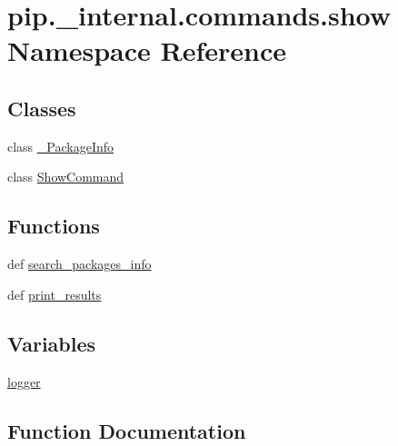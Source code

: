 \hypertarget{namespacepip_1_1__internal_1_1commands_1_1show}{}\section{pip.\+\_\+internal.\+commands.\+show Namespace Reference}
\label{namespacepip_1_1__internal_1_1commands_1_1show}
\subsection*{Classes}
\begin{DoxyCompactItemize}
\item 
class \hyperlink{classpip_1_1__internal_1_1commands_1_1show_1_1__PackageInfo}{\+\_\+\+Package\+Info}
\item 
class \hyperlink{classpip_1_1__internal_1_1commands_1_1show_1_1ShowCommand}{Show\+Command}
\end{DoxyCompactItemize}
\subsection*{Functions}
\begin{DoxyCompactItemize}
\item 
def \hyperlink{namespacepip_1_1__internal_1_1commands_1_1show_a139fe722401a6599c68049f2813deb1d}{search\+\_\+packages\+\_\+info}
\item 
def \hyperlink{namespacepip_1_1__internal_1_1commands_1_1show_a14c3b6992545a8c4b568facb76eaae04}{print\+\_\+results}
\end{DoxyCompactItemize}
\subsection*{Variables}
\begin{DoxyCompactItemize}
\item 
\hyperlink{namespacepip_1_1__internal_1_1commands_1_1show_a8dcbd0248e66771bc7d6533c834232f6}{logger}
\end{DoxyCompactItemize}


\subsection{Function Documentation}
\mbox{\label{namespacepip_1_1__internal_1_1commands_1_1show_a14c3b6992545a8c4b568facb76eaae04}} 
